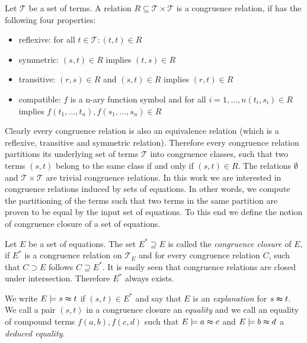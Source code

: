\begin{definition}

Let $\mathcal{T}$ be a set of terms.
A relation $R \subseteq \mathcal{T} \times \mathcal{T}$ is a congruence relation, if has the following four properties:
\begin{itemize}
	\item reflexive: for all $t \in \mathcal{T}: (t,t) \in R$
	\item symmetric: $(s,t) \in R$ implies $(t,s) \in R$
	\item transitive: $(r,s) \in R$ and $(s,t) \in R$ implies $(r,t) \in R$
	\item compatible: $f$ is a n-ary function symbol and for all $i = 1,\ldots,n (t_i,s_i) \in R$ implies $f(t_1,\ldots,t_n),f(s_1,\ldots,s_n) \in R$
\end{itemize}

\end{definition}

Clearly every congruence relation is also an equivalence relation (which is a reflexive, transitive and symmetric relation).
Therefore every congruence relation partitions its underlying set of terms $\mathcal{T}$ into congruence classes, such that two terms $(s,t)$ belong to the same class if and only if $(s,t) \in R$.
The relations $\emptyset$ and $\mathcal{T} \times \mathcal{T}$ are trivial congruence relations.
In this work we are interested in congruence relations induced by sets of equations.
In other words, we compute the partitioning of the terms such that two terms in the same partition are proven to be equal by the input set of equations.
To this end we define the notion of congruence closure of a set of equations.

\begin{definition}

Let $E$ be a set of equations.
The set $E^* \supseteq E$ is called the \emph{congruence closure} of $E$, 
if $E^*$ is a congruence relation on $\mathcal{T}_E$ and for every congruence relation $C$, such that $C \supset E$ follows $C \supseteq E^*$.
It is easily seen that congruence relations are closed under intersection.
Therefore $E^*$ always exists.

\noindent We write $E \models s \thickapprox t$ if $(s,t) \in E^*$ and say that $E$ is an \emph{explanation} for $s \thickapprox t$.
We call a pair $(s,t)$ in a congruence closure an \emph{equality} and we call an equality of compound terms $f(a,b),f(c,d)$ such that $E \models a \thickapprox c$ and $E \models b \thickapprox d$ a \emph{deduced equality}.

\end{definition}

